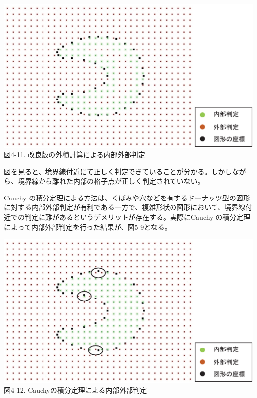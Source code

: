 \vspace{-5mm}
\begin{center}
  \includegraphics[width=14cm]{Cross_result.eps} \\
 \vspace{-10mm}
  図4-11. 改良版の外積計算による内部外部判定
\end{center}

図を見ると、境界線付近にて正しく判定できていることが分かる。しかしながら、境界線から離れた内部の格子点が正しく判定されていない。

Cauchy の積分定理による方法は、くぼみや穴などを有するドーナッツ型の図形に対する内部外部判定が有利である一方で、複雑形状の図形において、境界線付近での判定に難があるというデメリットが存在する。実際にCauchy の積分定理によって内部外部判定を行った結果が、図5-9となる。

\vspace{-5mm}
\begin{center}
  \includegraphics[width=14cm]{Cauchy_result.eps} \\
 \vspace{-10mm}
  図4-12. Cauchyの積分定理による内部外部判定
\end{center}

